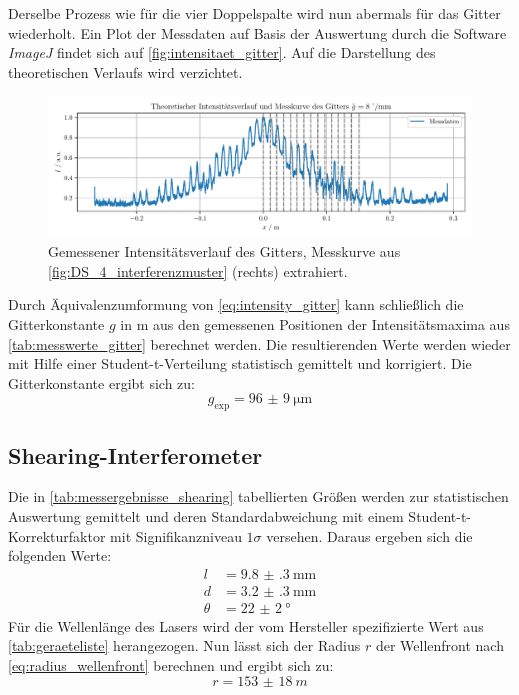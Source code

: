 \documentclass[ngerman]{scrartcl}
\begin{document}
Derselbe Prozess wie für die vier Doppelspalte wird nun abermals für das Gitter wiederholt. Ein Plot der Messdaten auf Basis der Auswertung durch die Software \textit{ImageJ} findet sich auf \autoref{fig:intensitaet_gitter}. Auf die Darstellung des theoretischen Verlaufs wird verzichtet.
%
\begin{figure}[H]
    \centering
    \begin{samepage}
        \includegraphics[width=\linewidth]{../python/plots/grating.pdf}
        \caption[Intensitätskurve Gitter]{Gemessener Intensitätsverlauf des Gitters, Messkurve aus \autoref{fig:DS_4_interferenzmuster} (rechts) extrahiert.}
        \label{fig:intensitaet_gitter}
    \end{samepage}
\end{figure}
%
Durch Äquivalenzumformung von \autoref{eq:intensity_gitter} kann schließlich die Gitterkonstante $g$ in \si{m} aus den gemessenen Positionen der Intensitätsmaxima aus \autoref{tab:messwerte_gitter} berechnet werden. Die resultierenden Werte werden wieder mit Hilfe einer Student-t-Verteilung statistisch gemittelt und korrigiert. Die Gitterkonstante ergibt sich zu:
\[g_{\text{exp}} = \SI{96(9)}{\micro\meter}\]


\subsection{Shearing-Interferometer}
\label{subsec:auswertung_shearing}

Die in \autoref{tab:messergebnisse_shearing} tabellierten Größen werden zur statistischen Auswertung gemittelt und deren Standardabweichung mit einem Student-t-Korrekturfaktor mit Signifikanzniveau $1\sigma$ versehen. Daraus ergeben sich die folgenden Werte:
\begin{align*}
    l      & = \SI{9.8(3)}{\milli\meter} \\
    d      & = \SI{3.2(3)}{\milli\meter} \\
    \theta & = \SI{22(2)}{\degree}
\end{align*}
Für die Wellenlänge des Lasers wird der vom Hersteller spezifizierte Wert aus \autoref{tab:geraeteliste} herangezogen. Nun lässt sich der Radius $r$ der Wellenfront nach \autoref{eq:radius_wellenfront} berechnen und ergibt sich zu:
\[r=\SI{153(18)}{m}\]
\end{document}
